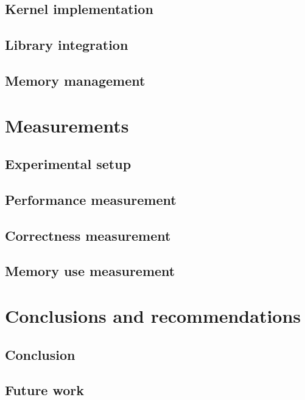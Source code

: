 \documentclass[11pt,twoside]{ce}
\begin{document}
		\section{Kernel implementation}
		
		
		\section{Library integration}
		
		
		\section{Memory management}
		
	
	\chapter{Measurements}
	\label{chap:measurements}
	
	
		\section{Experimental setup}
		
		
		\section{Performance measurement}
		
		
		\section{Correctness measurement}
		
		
		\section{Memory use measurement}
		
	
	\chapter{Conclusions and recommendations}
	\label{chap:ccl}
	
	
		\section{Conclusion}
		
		
		\section{Future work}		
		
	
	\printbibliography
\end{document}
